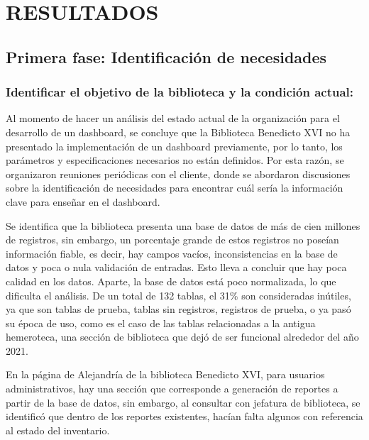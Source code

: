 \documentclass[spanish]{ieee_upb}
\begin{document}

\newpage
\section{RESULTADOS}


\subsection{Primera fase: Identificación de necesidades}

\subsubsection{Identificar el objetivo de la biblioteca y la condición actual:}
Al momento de hacer un análisis del estado actual de la organización para el desarrollo de un dashboard, se concluye que la Biblioteca Benedicto XVI no ha presentado la implementación de un dashboard previamente, por lo tanto, los parámetros y especificaciones necesarios no están definidos. Por esta razón, se organizaron reuniones periódicas con el cliente, donde se abordaron discusiones sobre la identificación de necesidades para encontrar cuál sería la información clave para enseñar en el dashboard.

\vspace{0.3cm}
Se identifica que la biblioteca presenta una base de datos de más de cien millones de registros, sin embargo, un porcentaje grande de estos registros no poseían información fiable, es decir, hay campos vacíos, inconsistencias en la base de datos y poca o nula validación de entradas. Esto lleva a concluir que hay poca calidad en los datos. Aparte, la base de datos está poco normalizada, lo que dificulta el análisis. De un total de 132 tablas, el 31\% son consideradas inútiles, ya que son tablas de prueba, tablas sin registros, registros de prueba, o ya pasó su época de uso, como es el caso de las tablas relacionadas a la antigua hemeroteca, una sección de biblioteca que dejó de ser funcional alrededor del año 2021. 

\vspace{0.3cm}
En la página de Alejandría de la biblioteca Benedicto XVI, para usuarios administrativos, hay una sección que corresponde a generación de reportes a partir de la base de datos, sin embargo, al consultar con jefatura de biblioteca, se identificó que dentro de los reportes existentes, hacían falta algunos con referencia al estado del inventario. 
\end{document}
